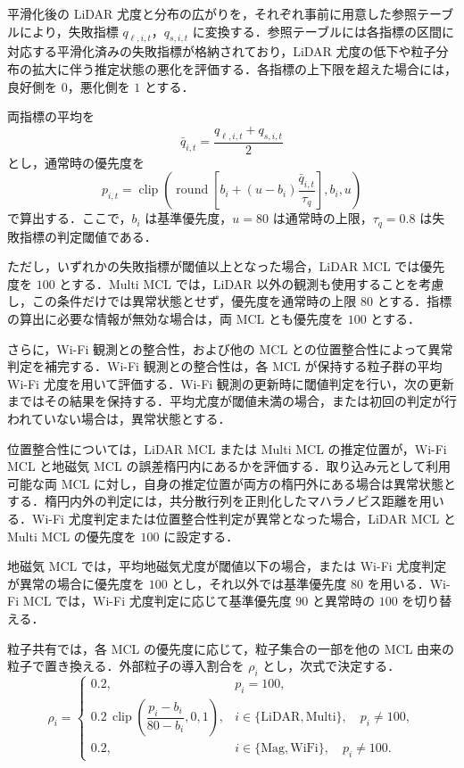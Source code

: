 平滑化後の LiDAR 尤度と分布の広がりを，それぞれ事前に用意した参照テーブルにより，失敗指標 $q_{\ell,i,t}$，$q_{s,i,t}$ に変換する．参照テーブルには各指標の区間に対応する平滑化済みの失敗指標が格納されており，LiDAR 尤度の低下や粒子分布の拡大に伴う推定状態の悪化を評価する．各指標の上下限を超えた場合には，良好側を $0$，悪化側を $1$ とする．

両指標の平均を
\begin{equation}
  \bar{q}_{i,t}
  =
  \frac{q_{\ell,i,t}+q_{s,i,t}}{2}
  \label{eq:mean_failure_indicator}
\end{equation}
とし，通常時の優先度を
\begin{equation}
  p_{i,t}
  =
  \operatorname{clip}
  \left(
    \operatorname{round}
    \left[
      b_i+(u-b_i)\frac{\bar{q}_{i,t}}{\tau_q}
    \right],
    b_i,u
  \right)
  \label{eq:normal_priority}
\end{equation}
で算出する．ここで，$b_i$ は基準優先度，$u=80$ は通常時の上限，$\tau_q=0.8$ は失敗指標の判定閾値である．

ただし，いずれかの失敗指標が閾値以上となった場合，LiDAR MCL では優先度を $100$ とする．Multi MCL では，LiDAR 以外の観測も使用することを考慮し，この条件だけでは異常状態とせず，優先度を通常時の上限 $80$ とする．指標の算出に必要な情報が無効な場合は，両 MCL とも優先度を $100$ とする．

さらに，Wi-Fi 観測との整合性，および他の MCL との位置整合性によって異常判定を補完する．Wi-Fi 観測との整合性は，各 MCL が保持する粒子群の平均 Wi-Fi 尤度を用いて評価する．Wi-Fi 観測の更新時に閾値判定を行い，次の更新まではその結果を保持する．平均尤度が閾値未満の場合，または初回の判定が行われていない場合は，異常状態とする．

位置整合性については，LiDAR MCL または Multi MCL の推定位置が，Wi-Fi MCL と地磁気 MCL の誤差楕円内にあるかを評価する．取り込み元として利用可能な両 MCL に対し，自身の推定位置が両方の楕円外にある場合は異常状態とする．楕円内外の判定には，共分散行列を正則化したマハラノビス距離を用いる．Wi-Fi 尤度判定または位置整合性判定が異常となった場合，LiDAR MCL と Multi MCL の優先度を $100$ に設定する．

地磁気 MCL では，平均地磁気尤度が閾値以下の場合，または Wi-Fi 尤度判定が異常の場合に優先度を $100$ とし，それ以外では基準優先度 $80$ を用いる．Wi-Fi MCL では，Wi-Fi 尤度判定に応じて基準優先度 $90$ と異常時の $100$ を切り替える．

粒子共有では，各 MCL の優先度に応じて，粒子集合の一部を他の MCL 由来の粒子で置き換える．外部粒子の導入割合を $\rho_i$ とし，次式で決定する．
\begin{equation}
  \rho_i
  =
  \begin{cases}
    0.2,
      & p_i=100, \\[3pt]
    0.2\,
    \operatorname{clip}
    \left(
      \dfrac{p_i-b_i}{80-b_i},0,1
    \right),
      & i\in\{\mathrm{LiDAR},\mathrm{Multi}\},
        \quad p_i\ne100, \\[8pt]
    0.2,
      & i\in\{\mathrm{Mag},\mathrm{WiFi}\},
        \quad p_i\ne100.
  \end{cases}
  \label{eq:particle_sharing_ratio}
\end{equation}

